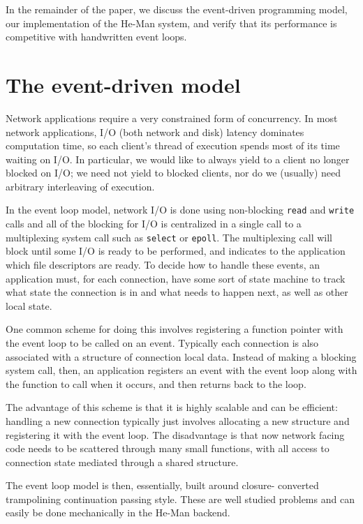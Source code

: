\documentclass[preprint]{sigplanconf}
\renewcommand{\t}{\texttt}
\begin{document}
In the remainder of the paper, we discuss the event-driven programming model,
our implementation of the He-Man system, and verify that its performance is
competitive with handwritten event loops.

\section{The event-driven model}

Network applications require a very constrained form of
concurrency. In most network applications, I/O (both network
and disk) latency dominates computation time, so each client's thread
of execution spends most of its time waiting on I/O. In particular, we
would like to always yield to a client no longer blocked on I/O; we
need not yield to blocked clients, nor do we (usually) need arbitrary
interleaving of execution.

In the event loop model, network I/O is done using non-blocking
\t{read} and \t{write} calls and all of the blocking for I/O is
centralized in a single call to a multiplexing system call such as
\t{select} or \t{epoll}. The multiplexing call will block until some 
I/O is ready to be performed, and indicates to the application
which file descriptors are ready. To decide how to handle these 
events, an application must, for each connection, have some sort of 
state machine to track what state the connection is in and what 
needs to happen next, as well as other local state.

One common scheme for doing this involves registering a function
pointer with the event loop to be called on an event. Typically each
connection is also associated with a structure of connection local
data. Instead of making a blocking system call, then, an application
registers an event with the event loop along with the function to call
when it occurs, and then returns back to the loop.

The advantage of this scheme is that it is highly scalable and can be
efficient: handling a new connection typically just involves
allocating a new structure and registering it with the event loop. The
disadvantage is that now network facing code needs to be scattered
through many small functions, with all access to connection state
mediated through a shared structure.

The event loop model is then, essentially, built around closure-
converted trampolining continuation passing style. These are well
studied problems and can easily be done mechanically in the He-Man
backend.
\end{document}
